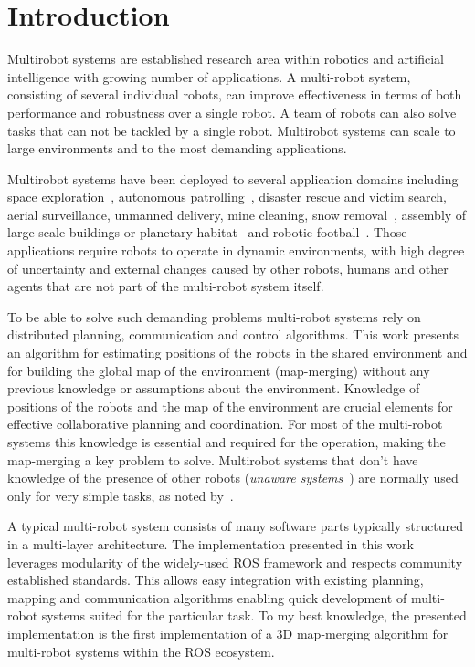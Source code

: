 \chapter*{Introduction}

Multirobot systems are established research area within robotics and artificial intelligence with growing number of applications. A multi-robot system, consisting of several individual robots, can improve effectiveness in terms of both performance and robustness over a single robot. A team of robots can also solve tasks that can not be tackled by a single robot. Multirobot systems can scale to large environments and to the most demanding applications.

Multirobot systems have been deployed to several application domains including space exploration~\citep{goldberg2002distributedspace,huntsberger2003campout}, autonomous patrolling~\citep{parker2003parolling100}, disaster rescue and victim search, aerial surveillance, unmanned delivery, mine cleaning, snow removal~\citep{choset2001coverage}, assembly of large-scale buildings or planetary habitat~\citep{goldberg2002distributedspace} and robotic football~\citep{asada1999robocup}. Those applications require robots to operate in  dynamic environments, with high degree of uncertainty and external changes caused by other robots, humans and other agents that are not part of the multi-robot system itself.

To be able to solve such demanding problems multi-robot systems rely on distributed planning, communication and control algorithms. This work presents an algorithm for estimating positions of the robots in the shared environment and for building the global map of the environment (map-merging) without any previous knowledge or assumptions about the environment. Knowledge of positions of the robots and the map of the environment are crucial elements for effective collaborative planning and coordination. For most of the multi-robot systems this knowledge is essential and required for the operation, making the map-merging a key problem to solve. Multirobot systems that don't have knowledge of the presence of other robots (\textit{unaware systems}~\citep{farinelli2004multirobot}) are normally used only for very simple tasks, as noted by~\citet{farinelli2004multirobot}.

A typical multi-robot system consists of many software parts typically structured in a multi-layer architecture. The implementation presented in this work leverages modularity of the widely-used \gls{ROS} framework and respects community established standards. This allows easy integration with existing planning, mapping and communication algorithms enabling quick development of multi-robot systems suited for the particular task. To my best knowledge, the presented implementation is the first implementation of a \gls{3D} map-merging algorithm for multi-robot systems within the \gls{ROS} ecosystem.

